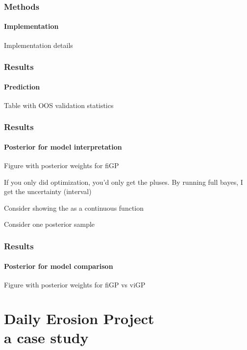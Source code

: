\documentclass{snedecorbeamer}
\begin{document}
\begin{frame}
  \frametitle{Methods}
  \framesubtitle{Implementation}

  Implementation details
\end{frame}

\begin{frame}
  \frametitle{Results}
  \framesubtitle{Prediction}

  Table with OOS validation statistics

  \begin{table}
    \caption{Mean validation statistics:~RMSE (left) and negative PPLD (right).
      Smaller values are better. Bold is best in class.
    }%
    \label{tab:validation-statistics-mini}
  \end{table}

\end{frame}

\begin{frame}
  \frametitle{Results}
  \framesubtitle{Posterior for model interpretation}

  Figure with posterior weights for fiGP

  If you only did optimization, you'd only get the pluses. By running full
  bayes, I get the uncertainty (interval)

  Consider showing the as a continuous function

  Consider one posterior sample
\end{frame}

\begin{frame}
  \frametitle{Results}
  \framesubtitle{Posterior for model comparison}

  Figure with posterior weights for fiGP vs viGP
\end{frame}

\section{Daily Erosion Project \\ {\small a case study}}
\end{document}
